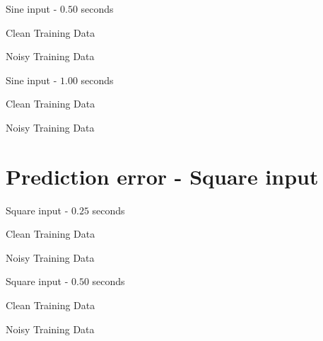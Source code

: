 \documentclass{beamer}
\begin{document}
\begin{frame}{Sine input - $0.50$ seconds}
    \scriptsize
    \begin{table}[!ht]
        \centering
        \caption{Clean Training Data}
    \end{table}

    \begin{table}[!ht]
        \centering
        \caption{Noisy Training Data}
    \end{table}
\end{frame}

\begin{frame}{Sine input - $1.00$ seconds}
    \scriptsize
    \begin{table}[!ht]
        \centering
        \caption{Clean Training Data}
    \end{table}

    \begin{table}[!ht]
        \centering
        \caption{Noisy Training Data}
    \end{table}
\end{frame}


\section{Prediction error - Square input}

\begin{frame}{Square input - $0.25$ seconds}
    \scriptsize
    \begin{table}[!ht]
        \centering
        \caption{Clean Training Data}
    \end{table}

    \begin{table}[!ht]
        \centering
        \caption{Noisy Training Data}
    \end{table}
\end{frame}

\begin{frame}{Square input - $0.50$ seconds}
    \scriptsize
    \begin{table}[!ht]
        \centering
        \caption{Clean Training Data}
    \end{table}

    \begin{table}[!ht]
        \centering
        \caption{Noisy Training Data}
    \end{table}
\end{frame}
\end{document}
